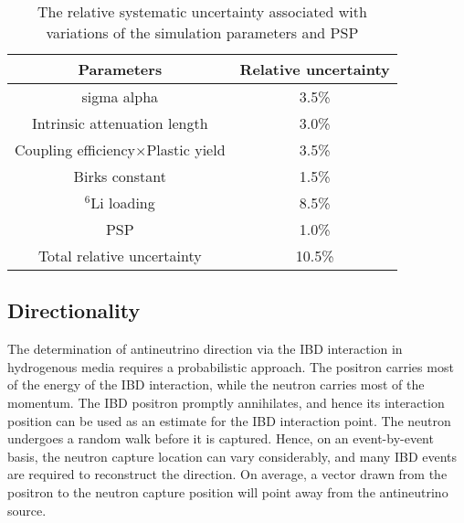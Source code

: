 \documentclass[final,5p,times,twocolumn]{elsarticle}
\begin{document}
\begin{table}[ht!]
\caption{The relative systematic uncertainty associated with variations of the simulation parameters and PSP} 
\label{tab_systematic}
\centering
\begin{tabular}{|c||c| }
\hline
Parameters                          & Relative uncertainty \\
\hline
\hline
sigma alpha     & 3.5\% \\ 
Intrinsic attenuation length        & 3.0\% \\ 
Coupling efficiency$\times$Plastic yield  & 3.5\% \\ 
Birks constant                      & 1.5\% \\ 
$^6$Li loading                      & 8.5\% \\ 
PSP                                 & 1.0\% \\ 
\hline
\hline
Total relative uncertainty         & 10.5\% \\      
\hline
\end{tabular}
\end{table}

\subsection{Directionality}

The determination of antineutrino direction via the IBD interaction in hydrogenous media requires a probabilistic approach. The positron carries most of the energy of the IBD interaction, while the neutron carries most of the momentum. 
The IBD positron promptly annihilates, and hence its interaction position can be used as an estimate for the IBD interaction point.
The neutron undergoes a random walk before it is captured. 
Hence, on an event-by-event basis, the neutron capture location can vary considerably, and many IBD events are required to reconstruct the direction.
On average, a vector drawn from the positron to the neutron capture position will point away from the antineutrino source. 
\end{document}
